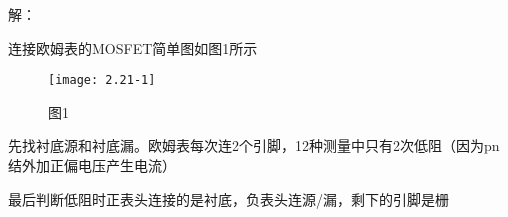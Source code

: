 






解：

连接欧姆表的MOSFET简单图如图1所示

		\begin{figure}[H] %
	\begin{minipage}{\linewidth}
		\texttt{[image: 2.21-1]}
	\end{minipage}
	\caption*{图1} %
\end{figure}


先找衬底源和衬底漏。欧姆表每次连2个引脚，12种测量中只有2次低阻（因为pn结外加正偏电压产生电流）

最后判断低阻时正表头连接的是衬底，负表头连源/漏，剩下的引脚是栅



































%







%







